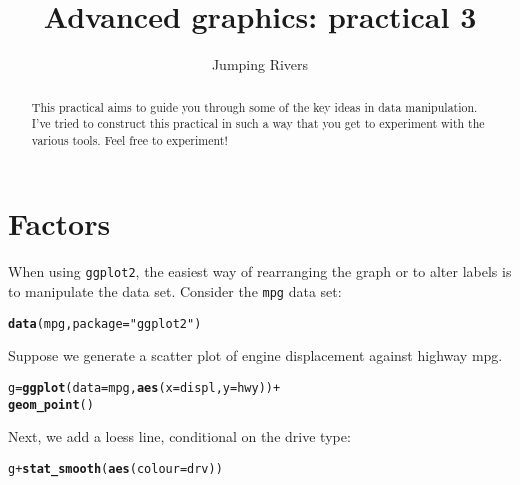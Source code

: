 \documentclass[a4paper,justified,openany]{tufte-handout}\usepackage[]{graphicx}\usepackage[]{color}
\title{Advanced graphics: practical 3 }
\author[Jumping Rivers]{Jumping Rivers}
\date{}  %
\makeatletter
\newcommand{\hlstr}[1]{\textcolor[rgb]{0.2,0.2,0.2}{#1}}%
\newcommand{\hlopt}[1]{\textcolor[rgb]{0.102,0.102,0.102}{#1}}%
\newcommand{\hlstd}[1]{\textcolor[rgb]{0.102,0.102,0.102}{#1}}%
\newcommand{\hlkwb}[1]{\textcolor[rgb]{0.102,0.102,0.102}{#1}}%
\newcommand{\hlkwc}[1]{\textcolor[rgb]{0.2,0.2,0.2}{#1}}%
\newcommand{\hlkwd}[1]{\textcolor[rgb]{0.102,0.102,0.102}{\textbf{#1}}}%
\newenvironment{kframe}{%
 \def\at@end@of@kframe{}%
 \ifinner\ifhmode%
  \def\at@end@of@kframe{\end{minipage}}%
  \begin{minipage}{\columnwidth}%
 \fi\fi%
 \def\FrameCommand##1{\hskip\@totalleftmargin \hskip-\fboxsep
 \colorbox{shadecolor}{##1}\hskip-\fboxsep
     \hskip-\linewidth \hskip-\@totalleftmargin \hskip\columnwidth}%
 \MakeFramed {\advance\hsize-\width
   \@totalleftmargin\z@ \linewidth\hsize
   \@setminipage}}%
 {\par\unskip\endMakeFramed%
 \at@end@of@kframe}
\newenvironment{knitrout}{}{} %
\newcommand{\cc}{\texttt}
\makeatother
\begin{document}
\maketitle%

\begin{abstract}
  \noindent This practical aims to guide you through some of the key ideas in
  data manipulation. I've tried to construct this practical in such a way that
  you get to experiment with the various tools. Feel free to experiment!
\end{abstract}


\section{Factors}

When using \cc{ggplot2}, the easiest way of rearranging the graph or to alter labels
is to manipulate the data set. Consider the \cc{mpg} data set:

\begin{knitrout}
\color{fgcolor}\begin{kframe}
\begin{alltt}
\hlkwd{data}\hlstd{(mpg,} \hlkwc{package} \hlstd{=} \hlstr{"ggplot2"}\hlstd{)}
\end{alltt}
\end{kframe}
\end{knitrout}

Suppose we generate a scatter plot of engine displacement against highway mpg.

\begin{knitrout}
\color{fgcolor}\begin{kframe}
\begin{alltt}
\hlstd{g} \hlkwb{=} \hlkwd{ggplot}\hlstd{(}\hlkwc{data}\hlstd{=mpg,} \hlkwd{aes}\hlstd{(}\hlkwc{x}\hlstd{=displ,} \hlkwc{y}\hlstd{=hwy))} \hlopt{+}
  \hlkwd{geom_point}\hlstd{()}
\end{alltt}
\end{kframe}
\end{knitrout}

\noindent Next, we add a loess line, conditional on the drive type:

\begin{knitrout}
\color{fgcolor}\begin{kframe}
\begin{alltt}
\hlstd{g} \hlopt{+} \hlkwd{stat_smooth}\hlstd{(}\hlkwd{aes}\hlstd{(}\hlkwc{colour}\hlstd{=drv))}
\end{alltt}
\end{kframe}
\end{knitrout}
\end{document}
